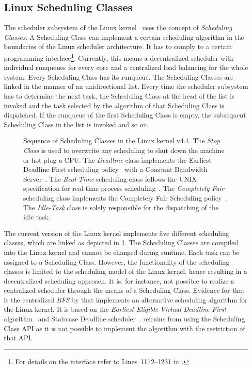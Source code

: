 \subsection{Linux Scheduling Classes}%
\label{sec:rw:linux_classes}

The scheduler subsystem of the Linux kernel~\cite{Linux44} uses the concept of \emph{Scheduling Classes}. A Scheduling Class can implement a certain scheduling algorithm in the boundaries of the Linux scheduler architecture. It has to comply to a certain programming interface\footnote{For details on the interface refer to  Lines~1172--1231 in \cite{Linux44}.}. Currently, this means a decentralized scheduler with individual runqueues for every core and a centralized load balancing for the whole system. Every Scheduling Class has its runqueue. The Scheduling Classes are linked in the manner of an unidirectional list. Every time the scheduler subsystem has to determine the next task, the Scheduling Class at the head of the list is invoked and the task selected by the algorithm of that Scheduling Class is dispatched. If the runqueue of the first Scheduling Class is empty, the subsequent Scheduling Class in the list is invoked and so on.

\begin{figure}[t!]\centering
	\caption[Sequence of Scheduling Classes in the Linux kernel v4.4.]{Sequence of Scheduling Classes in the Linux kernel v4.4. The \emph{Stop Class} is used to overwrite any scheduling to shut down the machine or hot-plug a CPU. The \emph{Deadline} class implements the Earliest Deadline First scheduling policy~\cite{Liu-1973-EDF} with a Constant Bandwidth Server~\cite{Abeni-1998-ConstantBandwidthServer}. The \emph{Real-Time} scheduling class follows the UNIX specification for real-time process scheduling~\cite{POSIX}. The \emph{Completely Fair} scheduling class implements the Completely Fair Scheduling policy~\cite{Jones-2009-CFS}. The \emph{Idle-Task} class is solely responsible for the dispatching of the idle task.}%
	\label{fig:intro:sched_classes}
\end{figure}

The current version of the Linux kernel implements five different scheduling classes, which are linked as depicted in \cref{fig:intro:sched_classes}. The Scheduling Classes are compiled into the Linux kernel and cannot be changed during runtime. Each task can be assigned to a Scheduling Class. However, the functionality of the scheduling classes is limited to the scheduling model of the Linux kernel, hence resulting in a decentralized scheduling approach. It is, for instance, not possible to realize a centralized scheduler through the means of a Scheduling Class. Evidence for that is the centralized \emph{BFS} by \textcite{BFS} that implements an alternative scheduling algorithm for the Linux kernel. It is based on the \emph{Earliest Eligible Virtual Deadline First} algorithm~\cite{Stoica-1995-EEVDA} and Staircase Deadline scheduler~\cite{SD}.  refrains from using the Scheduling Class \ac{API} as it is not possible to implement the algorithm with the restriction of that API.

